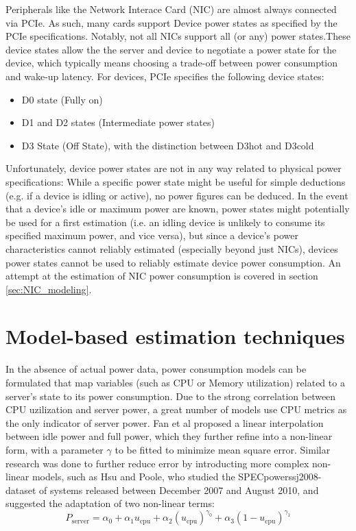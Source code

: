 Peripherals like the Network Interace Card (NIC) are almost always connected via PCIe. As such, many cards  support Device power states\parencite{technotes_pci_power_2024} as specified by the PCIe specifications. Notably, not all NICs support all (or any) power states.These device states allow the the server and device to negotiate a power state for the device, which typically means choosing a trade-off between power consumption and wake-up latency. For devices, PCIe specifies the following device states:
\begin{itemize}
    \item D0 state (Fully on)
    \item D1 and D2 states (Intermediate power states)
    \item D3 State (Off State), with the distinction between D3hot and D3cold
\end{itemize}
Unfortunately, device power states are not in any way related to physical power specifications: While a specific power state might be useful for simple deductions (e.g. if a device is idling or active), no power figures can be deduced. In the event that a device's idle or maximum power are known, power states might potentially be used for a first estimation (i.e. an idling device is unlikely to consume its specified maximum power, and vice versa), but since a device's power characteristics cannot reliably estimated (especially beyond just NICs), devices power states cannot be used to reliably estimate device power consumption. An attempt at the estimation of NIC power consumption is covered in section \ref{sec:NIC_modeling}.

\section{Model-based estimation techniques}
In the absence of actual power data, power consumption models can be formulated that map variables (such as CPU or Memory utilization) related to a server's state to its power consumption. 
Due to the strong correlation between CPU uzilization and server power, a great number of models use CPU metrics as the only indicator of server power. Fan et al\parencite{fan2007power} proposed a linear interpolation between idle power and full power, which they further refine into a non-linear form, with a parameter $\gamma$ to be fitted to minimize mean square error. Similar research was done to further reduce error by introducting more complex non-linear models, such as Hsu and Poole\parencite{hsu2011power}, who studied the SPECpower\textunderscore ssj2008-dataset of systems released between December 2007 and August 2010, and suggested the adaptation of two non-linear terms:
\begin{equation}
    P_{\text{server}} = \alpha_0 + \alpha_1 u_{\text{cpu}} + \alpha_2 \left( u_{\text{cpu}} \right)^{\gamma_0} + \alpha_3 \left( 1 - u_{\text{cpu}} \right)^{\gamma_1}
\end{equation}

